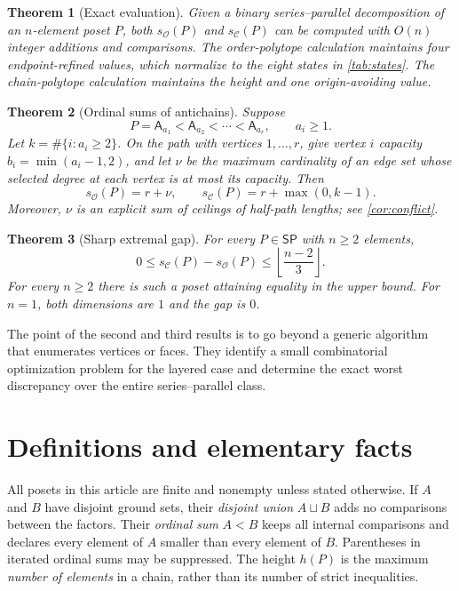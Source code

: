 \documentclass[11pt]{article}
\newtheorem{theorem}{Theorem}[section]
\theoremstyle{definition}
\newcommand{\OO}{\mathcal O}
\newcommand{\CC}{\mathcal C}
\newcommand{\sO}{s_{\OO}}
\newcommand{\sC}{s_{\CC}}
\newcommand{\SP}{\mathsf{SP}}
\newcommand{\A}[1]{\mathsf A_{#1}}
\begin{document}
\begin{theorem}[Exact evaluation]\label{thm:overview-recursion}
Given a binary series--parallel decomposition of an $n$-element poset $P$, both $\sO(P)$ and $\sC(P)$ can be computed with $O(n)$ integer additions and comparisons. The order-polytope calculation maintains four endpoint-refined values, which normalize to the eight states in \cref{tab:states}. The chain-polytope calculation maintains the height and one origin-avoiding value.
\end{theorem}

\begin{theorem}[Ordinal sums of antichains]\label{thm:overview-layers}
Suppose
\[
P=\A{a_1}<\A{a_2}<\cdots<\A{a_r},\qquad a_i\ge1.
\]
Let $k=\#\{i:a_i\ge2\}$. On the path with vertices $1,\ldots,r$, give vertex $i$ capacity $b_i=\min(a_i-1,2)$, and let $\nu$ be the maximum cardinality of an edge set whose selected degree at each vertex is at most its capacity. Then
\[
\boxed{\sO(P)=r+\nu,\qquad \sC(P)=r+\max(0,k-1).}
\]
Moreover, $\nu$ is an explicit sum of ceilings of half-path lengths; see \cref{cor:conflict}.
\end{theorem}

\begin{theorem}[Sharp extremal gap]\label{thm:overview-gap}
For every $P\in\SP$ with $n\ge2$ elements,
\[
0\le\sC(P)-\sO(P)\le\left\lfloor\frac{n-2}{3}\right\rfloor.
\]
For every $n\ge2$ there is such a poset attaining equality in the upper bound. For $n=1$, both dimensions are $1$ and the gap is $0$.
\end{theorem}

The point of the second and third results is to go beyond a generic algorithm that enumerates vertices or faces. They identify a small combinatorial optimization problem for the layered case and determine the exact worst discrepancy over the entire series--parallel class.

\section{Definitions and elementary facts}\label{sec:definitions}

All posets in this article are finite and nonempty unless stated otherwise. If $A$ and $B$ have disjoint ground sets, their \emph{disjoint union} $A\sqcup B$ adds no comparisons between the factors. Their \emph{ordinal sum} $A<B$ keeps all internal comparisons and declares every element of $A$ smaller than every element of $B$. Parentheses in iterated ordinal sums may be suppressed. The height $h(P)$ is the maximum \emph{number of elements} in a chain, rather than its number of strict inequalities.
\end{document}
